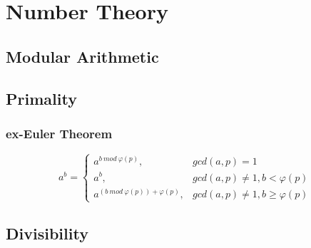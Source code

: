 \chapter{Number Theory}
\section{Modular Arithmetic}

\section{Primality}
\subsection{ex-Euler Theorem}
\begin{small}
$$
a^b=
\left\{  
             \begin{array}{lr}  
             a^{b\ mod\ \varphi(p)},              & gcd(a,p) = 1\\ 
             a^b,                                 & gcd(a,p) \neq 1, b < \varphi(p)\\
             a^{(b\ mod\ \varphi(p))+\varphi(p)}, & gcd(a,p) \neq 1, b \ge \varphi(p)
             \end{array}  
\right.
$$
\end{small}
\section{Divisibility}

